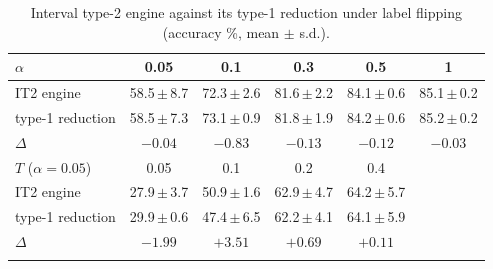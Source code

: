 \begin{table}[!tbp]
\centering
\caption{Interval type-2 engine against its type-1 reduction under label flipping (accuracy \%, mean $\pm$ s.d.).}
\label{tab:fou}
\setlength{\tabcolsep}{2.2pt}
\footnotesize
\begin{tabular}{lccccc}
\toprule
$\alpha$ & 0.05 & 0.1 & 0.3 & 0.5 & 1\\
\midrule
IT2 engine & 58.5\,$\pm$\,8.7 & 72.3\,$\pm$\,2.6 & 81.6\,$\pm$\,2.2 & 84.1\,$\pm$\,0.6 & 85.1\,$\pm$\,0.2\\
type-1 reduction & 58.5\,$\pm$\,7.3 & 73.1\,$\pm$\,0.9 & 81.8\,$\pm$\,1.9 & 84.2\,$\pm$\,0.6 & 85.2\,$\pm$\,0.2\\
$\Delta$ & $-0.04$ & $-0.83$ & $-0.13$ & $-0.12$ & $-0.03$\\
\midrule
$T$ ($\alpha=0.05$) & 0.05 & 0.1 & 0.2 & 0.4 & \\
\midrule
IT2 engine & 27.9\,$\pm$\,3.7 & 50.9\,$\pm$\,1.6 & 62.9\,$\pm$\,4.7 & 64.2\,$\pm$\,5.7 & \\
type-1 reduction & 29.9\,$\pm$\,0.6 & 47.4\,$\pm$\,6.5 & 62.2\,$\pm$\,4.1 & 64.1\,$\pm$\,5.9 & \\
$\Delta$ & $-1.99$ & $+3.51$ & $+0.69$ & $+0.11$ & \\
\botrule
\end{tabular}
\end{table}
